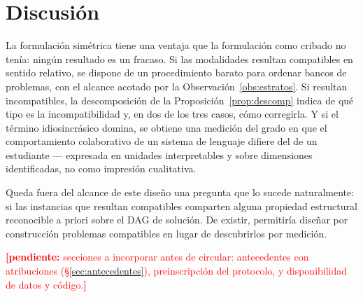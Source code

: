 \documentclass[11pt,a4paper]{article}
\theoremstyle{definition}
\theoremstyle{plain}
\theoremstyle{remark}
\newcommand{\pendiente}[1]{\textcolor{red}{\textbf{[pendiente:} #1\textbf{]}}}
\begin{document}
\section{Discusión}

La formulación simétrica tiene una ventaja que la formulación como cribado no
tenía: ningún resultado es un fracaso. Si las modalidades resultan compatibles en
sentido relativo, se dispone de un procedimiento barato para ordenar bancos de
problemas, con el alcance acotado por la Observación~\ref{obs:estratos}. Si
resultan incompatibles, la descomposición de la Proposición~\ref{prop:descomp}
indica de qué tipo es la incompatibilidad y, en dos de los tres casos, cómo
corregirla. Y si el término idiosincrásico domina, se obtiene una medición del
grado en que el comportamiento colaborativo de un sistema de lenguaje difiere del
de un estudiante --- expresada en unidades interpretables y sobre dimensiones
identificadas, no como impresión cualitativa.

Queda fuera del alcance de este diseño una pregunta que lo sucede naturalmente: si
las instancias que resultan compatibles comparten alguna propiedad estructural
reconocible a priori sobre el DAG de solución. De existir, permitiría diseñar por
construcción problemas compatibles en lugar de descubrirlos por medición.

\vspace{1em}
\noindent\pendiente{secciones a incorporar antes de circular: antecedentes con
atribuciones (§\ref{sec:antecedentes}), preinscripción del protocolo, y
disponibilidad de datos y código.}
\end{document}
